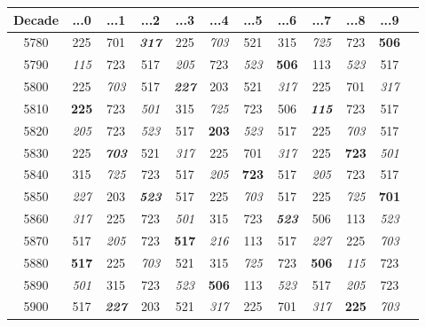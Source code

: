 \begin{Large}
	\begin{tabular}{| c | c | c | c | c | c | c | c | c | c | c | c |}
		\hline
		Decade&...0&...1&...2&...3&...4&...5&...6&...7&...8&...9\\\hline
		5780 & 225
		& 701
		& \textbf{\textit{317}}
		& 225
		& \textit{703}
		& 521
		& 315
		& \textit{725}
		& 723
		& \textbf{506}
		\\\hline
		5790 & \textit{115}
		& 723
		& 517
		& \textit{205}
		& 723
		& \textit{523}
		& \textbf{506}
		& 113
		& \textit{523}
		& 517
		\\\hline
		5800 & 225
		& \textit{703}
		& 517
		& \textbf{\textit{227}}
		& 203
		& 521
		& \textit{317}
		& 225
		& 701
		& \textit{317}
		\\\hline
		5810 & \textbf{225}
		& 723
		& \textit{501}
		& 315
		& \textit{725}
		& 723
		& 506
		& \textbf{\textit{115}}
		& 723
		& 517
		\\\hline
		5820 & \textit{205}
		& 723
		& \textit{523}
		& 517
		& \textbf{203}
		& \textit{523}
		& 517
		& 225
		& \textit{703}
		& 517
		\\\hline
		5830 & 225
		& \textbf{\textit{703}}
		& 521
		& \textit{317}
		& 225
		& 701
		& \textit{317}
		& 225
		& \textbf{723}
		& \textit{501}
		\\\hline
		5840 & 315
		& \textit{725}
		& 723
		& 517
		& \textit{205}
		& \textbf{723}
		& 517
		& \textit{205}
		& 723
		& 517
		\\\hline
		5850 & \textit{227}
		& 203
		& \textbf{\textit{523}}
		& 517
		& 225
		& \textit{703}
		& 517
		& 225
		& \textit{725}
		& \textbf{701}
		\\\hline
		5860 & \textit{317}
		& 225
		& 723
		& \textit{501}
		& 315
		& 723
		& \textbf{\textit{523}}
		& 506
		& 113
		& \textit{523}
		\\\hline
		5870 & 517
		& \textit{205}
		& 723
		& \textbf{517}
		& \textit{216}
		& 113
		& 517
		& \textit{227}
		& 225
		& \textit{703}
		\\\hline
		5880 & \textbf{517}
		& 225
		& \textit{703}
		& 521
		& 315
		& \textit{725}
		& 723
		& \textbf{506}
		& \textit{115}
		& 723
		\\\hline
		5890 & \textit{501}
		& 315
		& 723
		& \textit{523}
		& \textbf{506}
		& 113
		& \textit{523}
		& 517
		& \textit{205}
		& 723
		\\\hline
		5900 & 517
		& \textbf{\textit{227}}
		& 203
		& 521
		& \textit{317}
		& 225
		& 701
		& \textit{317}
		& \textbf{225}
		& \textit{703}

\end{tabular}
\end{Large}
